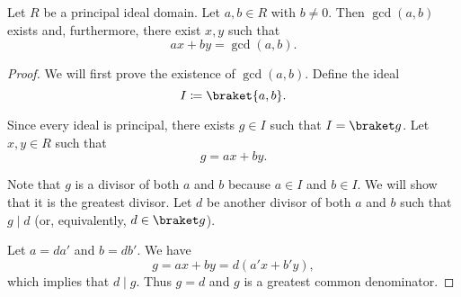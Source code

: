 \begin{theorem}\label{thm:bezout_identity}
  Let \( R \) be a principal ideal domain. Let \( a, b \in R \) with \( b \neq 0 \). Then \( \gcd(a, b) \) exists and, furthermore, there exist \( x, y \) such that
  \begin{equation*}
    ax + by = \gcd(a, b).
  \end{equation*}
\end{theorem}
\begin{proof}
  We will first prove the existence of \( \gcd(a, b) \). Define the ideal
  \begin{equation*}
    I \coloneqq \braket{a, b}.
  \end{equation*}

  Since every ideal is principal, there exists \( g \in I \) such that \( I = \braket g \). Let \( x, y \in R \) such that
  \begin{equation*}
    g = ax + by.
  \end{equation*}

  Note that \( g \) is a divisor of both \( a \) and \( b \) because \( a \in I \) and \( b \in I \). We will show that it is the greatest divisor. Let \( d \) be another divisor of both \( a \) and \( b \) such that \( g \mid d \) (or, equivalently, \( d \in \braket g \)).

  Let \( a = da' \) and \( b = db' \). We have
  \begin{equation*}
    g = ax + by = d(a'x + b'y),
  \end{equation*}
  which implies that \( d \mid g \). Thus \( g = d \) and \( g \) is a greatest common denominator.
\end{proof}

